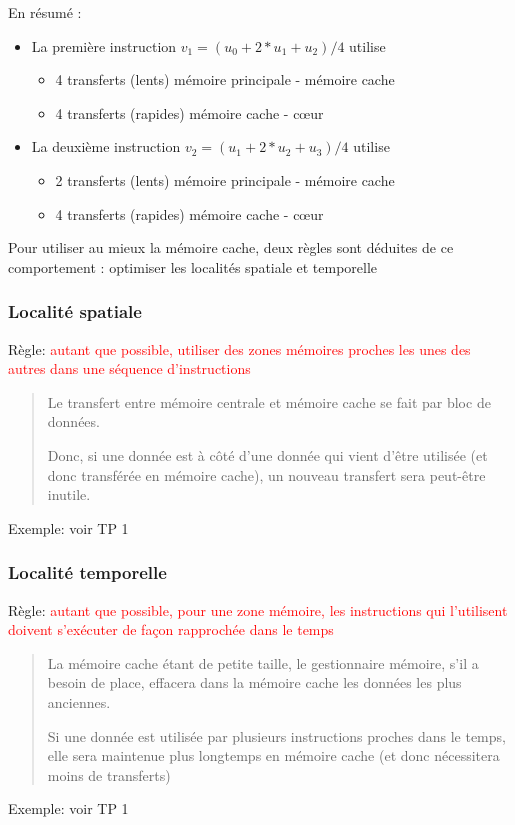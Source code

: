 \documentclass{beamer}
\begin{document}
\begin{frame}
	En résumé :
	\bigskip
	\begin{itemize}
		\item La première instruction $v_1 = (u_0 + 2*u_1 + u_2)/4$ utilise
		\begin{itemize}
			\item 4 transferts (lents) mémoire principale - mémoire cache
			\item 4 transferts (rapides)  mémoire cache - c\oe ur
		\end{itemize} 
	\bigskip
		\item La deuxième instruction $v_2 = (u_1 + 2*u_2 + u_3)/4$ utilise
		\begin{itemize}
			\item 2 transferts (lents) mémoire principale - mémoire cache
			\item 4 transferts (rapides) mémoire cache - c\oe ur
		\end{itemize}
	\end{itemize}

\vfill
   Pour utiliser au mieux la mémoire cache, deux règles sont déduites de ce comportement : optimiser les localités spatiale et temporelle
\end{frame}

\begin{frame}
\frametitle{Localit\'e spatiale}
Règle:  \textcolor{red}{autant que possible, utiliser des zones m\'emoires proches les unes des autres dans une s\'equence d'instructions}
\begin{quote}
	Le transfert entre m\'emoire centrale et m\'emoire cache se fait par bloc de donn\'ees.
	
	Donc, si une donn\'ee est \`a c\^ot\'e d'une donn\'ee qui vient d'\^etre utilis\'ee (et donc transf\'er\'ee en m\'emoire cache), un nouveau transfert sera peut-\^etre inutile.
\end{quote}

\vfill
Exemple: voir TP 1
\end{frame}

\begin{frame}
\frametitle{Localit\'e temporelle}
Règle: 
	\textcolor{red}{autant que possible, pour une zone m\'emoire, les instructions qui l'utilisent doivent s'ex\'ecuter de façon rapproch\'ee dans le temps}
	
	\begin{quote}
		La m\'emoire cache \'etant de petite taille, le gestionnaire m\'emoire, s'il a besoin de place, effacera dans la m\'emoire cache les donn\'ees les plus anciennes.
		
		Si une donn\'ee est utilis\'ee par plusieurs instructions proches dans le temps, elle sera maintenue plus longtemps en m\'e\-moi\-re cache (et donc n\'ecessitera moins de transferts)
	\end{quote}
Exemple: voir TP 1
\end{frame}
\end{document}
